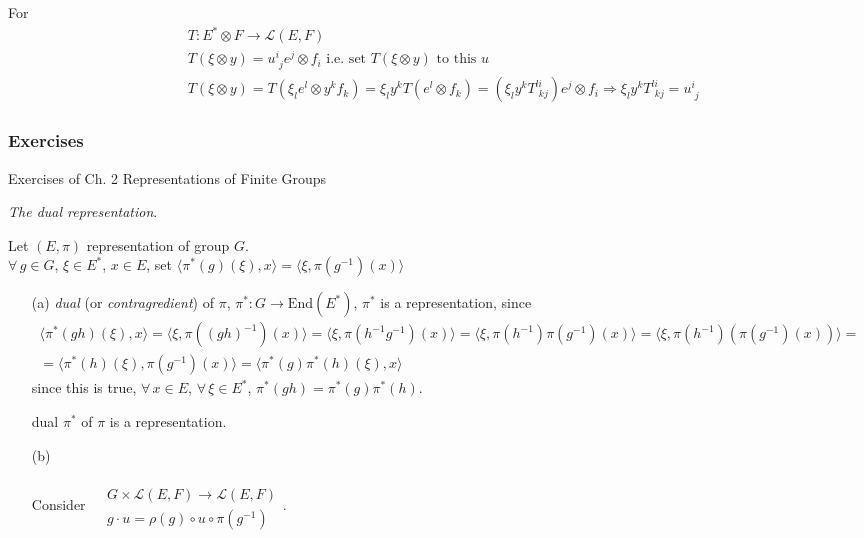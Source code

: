 \documentclass[10pt]{amsart}
\newcommand{\exercisehead}[1]
  { \smallskip
   \noindent{\small\bf Exercise #1.}
  }
\begin{document}
\begin{multicols*}{2}
For 
\[
\begin{aligned}
  & T : E^* \otimes F \to \mathcal{L}(E,F) \\
  & T(\xi \otimes y) = u^i_{ \,\,j}e^j \otimes f_i \text{ i.e. set $T(\xi \otimes y)$ to this $u$} \\
  & T(\xi \otimes y) = T(\xi_l e^l \otimes y^k f_k) = \xi_l y^k T(e^l \otimes f_k) = (\xi_l y^k T^{li}_{ \,\, kj} ) e^j \otimes f_i \Longrightarrow \xi_l y^k T^{li}_{ \,\, kj} = u^i_{ \,\, j}
\end{aligned}
\]

\subsubsection*{Exercises}

Exercises of Ch. 2 Representations of Finite Groups \cite{YKosmann-Schwarzbach2010}

\exercisehead{2.6}\cite{YKosmann-Schwarzbach2010} \emph{The dual representation}.  

Let $(E,\pi)$ representation of group $G$.  \\
$\forall \, g \in G$, $\xi \in E^*$, $x\in E$, set $\langle \pi^*(g)(\xi), x \rangle = \langle \xi, \pi(g^{-1})(x) \rangle$
\begin{enumerate}
\item[(a)] \emph{dual} (or \emph{contragredient}) of $\pi$, $\pi^*:G \to \text{End}(E^*)$, $\pi^*$ is a representation, since
\[
\begin{gathered}
  \langle \pi^*(gh)(\xi),x\rangle = \langle \xi, \pi((gh)^{-1})(x) \rangle = \langle \xi, \pi(h^{-1}g^{-1})(x) \rangle = \langle \xi, \pi(h^{-1}) \pi(g^{-1})(x) \rangle = \langle \xi, \pi(h^{-1}) (\pi(g^{-1})(x)) \rangle =  \\
= \langle \pi^*(h)(\xi), \pi(g^{-1})(x) \rangle = \langle \pi^*(g)\pi^*(h)(\xi), x \rangle
\end{gathered}
\]
since this is true, $\forall \, x \in E$, $\forall \, \xi \in E^*$, $\pi^*(gh) = \pi^*(g)\pi^*(h)$.  

dual $\pi^*$ of $\pi$ is a representation.  

\item[(b)]

Consider $\begin{aligned} & \quad \\
  & G \times \mathcal{L}(E,F) \to \mathcal{L}(E,F) \\
  & g\cdot u = \rho(g) \circ u \circ \pi(g^{-1}) \end{aligned}$.  


\end{enumerate}
\end{multicols*}
\end{document}
